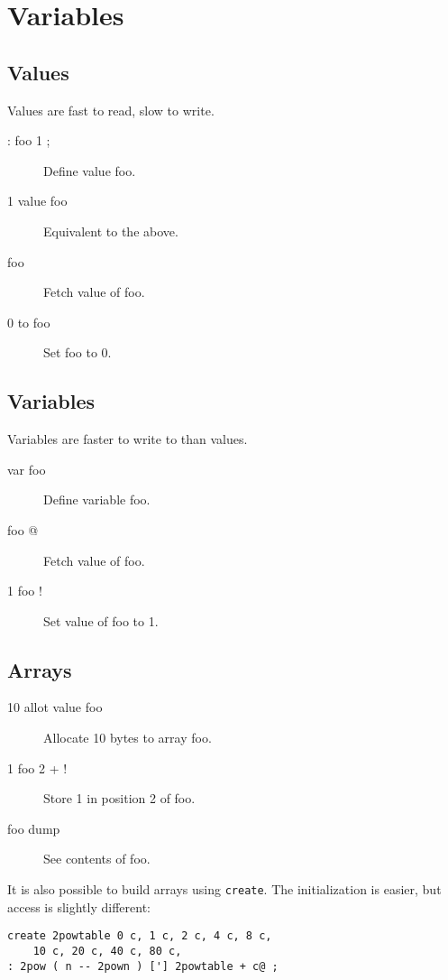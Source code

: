\section{Variables}

\subsection{Values}

Values are fast to read, slow to write.

\begin{description}
\item[: foo 1 ;] Define value foo.
\item[1 value foo] Equivalent to the above.
\item[foo] Fetch value of foo.
\item[0 to foo] Set foo to 0.
\end{description}

\subsection{Variables}

Variables are faster to write to than values.

\begin{description}
\item[var foo] Define variable foo.
\item[foo @] Fetch value of foo.
\item[1 foo !] Set value of foo to 1.
\end{description}

\subsection{Arrays}

\begin{description}
\item[10 allot value foo] Allocate 10 bytes to array foo.
\item[1 foo 2 + !] Store 1 in position 2 of foo.
\item[foo dump] See contents of foo.
\end{description}

It is also possible to build arrays using \texttt{create}. The initialization is easier, but access is slightly different:

\begin{verbatim}
create 2powtable 0 c, 1 c, 2 c, 4 c, 8 c,
	10 c, 20 c, 40 c, 80 c,
: 2pow ( n -- 2pown ) ['] 2powtable + c@ ;
\end{verbatim}


